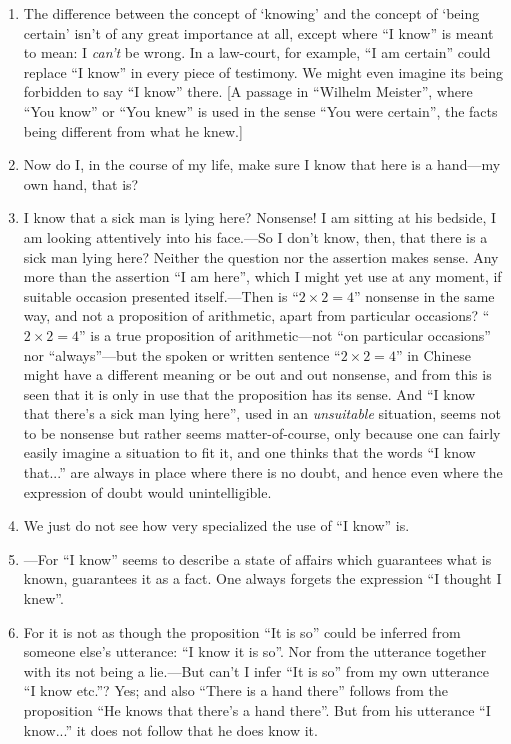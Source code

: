\documentclass{book}
\begin{document}
\begin{enumerate}
\item
The difference between the concept of `knowing' and the concept of `being
certain' isn't of any great importance at all, except where ``I know'' is meant
to mean: I \emph{can't} be wrong. In a law-court, for example, ``I am certain''
could replace ``I know'' in every piece of testimony. We might even imagine its
being forbidden to say ``I know'' there. {[}A passage in ``Wilhelm Meister'',
where ``You know'' or ``You knew'' is used in the sense ``You were certain'',
the facts being different from what he knew.{]}

\item
Now do I, in the course of my life, make sure I know that here is a hand---my
own hand, that is?

\item
I know that a sick man is lying here? Nonsense! I am sitting at his bedside, I
am looking attentively into his face.---So I don't know, then, that there is a
sick man lying here? Neither the question nor the assertion makes sense. Any
more than the assertion ``I am here'', which I might yet use at any moment, if
suitable occasion presented itself.---Then is ``$2{\times}2=4$'' nonsense in
the same way, and not a proposition of arithmetic, apart from particular
occasions?  ``$2{\times}2=4$'' is a true proposition of arithmetic---not ``on
particular occasions'' nor ``always''---but the spoken or written sentence
``$2{\times}2=4$'' in Chinese might have a different meaning or be out and out
nonsense, and from this is seen that it is only in use that the proposition has
its sense. And ``I know that there's a sick man lying here'', used in an
\emph{unsuitable} situation, seems not to be nonsense but rather seems
matter-of-course, only because one can fairly easily imagine a situation to fit
it, and one thinks that the words ``I know that...'' are always in place where
there is no doubt, and hence even where the expression of doubt would
unintelligible.

\item
We just do not see how very specialized the use of ``I know'' is.

\item
---For ``I know'' seems to describe a state of affairs which guarantees what is
known, guarantees it as a fact. One always forgets the expression ``I thought I
knew''.

\item
For it is not as though the proposition ``It is so'' could be inferred from
someone else's utterance: ``I know it is so''. Nor from the utterance together
with its not being a lie.---But can't I infer ``It is so'' from my own
utterance ``I know etc.''? Yes; and also ``There is a hand there'' follows from
the proposition ``He knows that there's a hand there''. But from his utterance
``I know...'' it does not follow that he does know it.


\end{enumerate}
\end{document}
